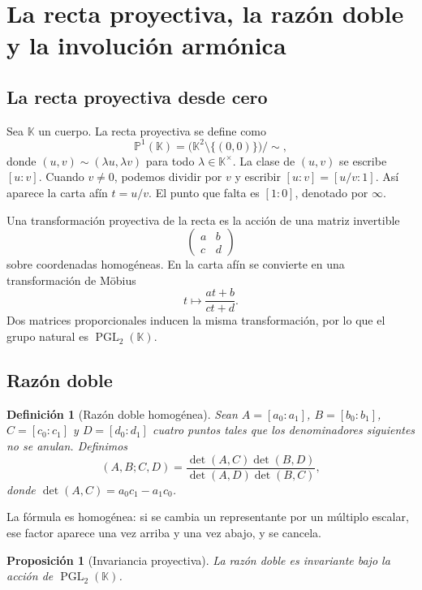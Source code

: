 \documentclass[11pt,oneside]{scrartcl}
\theoremstyle{plainblue}
\newtheorem{proposition}[theorem]{Proposición}
\theoremstyle{definitionblue}
\newtheorem{definition}[theorem]{Definición}
\theoremstyle{remarkgray}
\newcommand{\KK}{\mathbb{K}}
\newcommand{\PP}{\mathbb{P}}
\newcommand{\PGL}{\operatorname{PGL}}
\begin{document}
\section{La recta proyectiva, la razón doble y la involución armónica}

\subsection{La recta proyectiva desde cero}

Sea \(\KK\) un cuerpo. La recta proyectiva se define como
\[
\PP^1(\KK)=\bigl(\KK^2\setminus\{(0,0)\}\bigr)/\sim,
\]
donde \((u,v)\sim(\lambda u,\lambda v)\) para todo \(\lambda\in\KK^\times\). La
clase de \((u,v)\) se escribe \([u:v]\). Cuando \(v\ne0\), podemos dividir por
\(v\) y escribir \([u:v]=[u/v:1]\). Así aparece la carta afín \(t=u/v\). El punto
que falta es \([1:0]\), denotado por \(\infty\).

Una transformación proyectiva de la recta es la acción de una matriz invertible
\[
\begin{pmatrix}a&b\\c&d\end{pmatrix}
\]
sobre coordenadas homogéneas. En la carta afín se convierte en una transformación de
Möbius
\[
t\longmapsto\frac{at+b}{ct+d}.
\]
Dos matrices proporcionales inducen la misma transformación, por lo que el grupo
natural es \(\PGL_2(\KK)\).

\subsection{Razón doble}

\begin{definition}[Razón doble homogénea]
Sean \(A=[a_0:a_1]\), \(B=[b_0:b_1]\), \(C=[c_0:c_1]\) y
\(D=[d_0:d_1]\) cuatro puntos tales que los denominadores siguientes no se anulan.
Definimos
\[
(A,B;C,D)=
\frac{\det(A,C)\det(B,D)}{\det(A,D)\det(B,C)},
\]
donde \(\det(A,C)=a_0c_1-a_1c_0\).
\end{definition}

La fórmula es homogénea: si se cambia un representante por un múltiplo escalar, ese
factor aparece una vez arriba y una vez abajo, y se cancela.

\begin{proposition}[Invariancia proyectiva]
La razón doble es invariante bajo la acción de \(\PGL_2(\KK)\).
\end{proposition}
\end{document}
